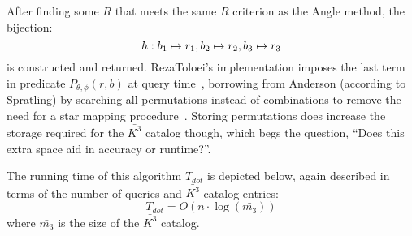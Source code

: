 After finding some $R$ that meets the same $R$ criterion as the Angle method, the bijection:
\begin{equation}
    h: b_1 \mapsto r_1, b_2 \mapsto r_2, b_3 \mapsto r_3
\end{equation}
is constructed and returned.
RezaToloei's implementation imposes the last term in predicate $P_{\theta, \phi}(r, b)$ at query
time~\cite{toloei:compositeIdentification}, borrowing from Anderson (according to Spratling) by searching all
permutations instead of combinations to remove the need for a star mapping
procedure~\cite{anderson:autonomousStarSensing}.
Storing permutations does increase the storage required for the $\bar{K^3}$ catalog though, which begs the question,
``Does this extra space aid in accuracy or runtime?''.

%

The running time of this algorithm $T_{dot}$ is depicted below, again described in terms of the number of queries
and $\bar{K^3}$ catalog entries:
\begin{equation}\label{eq:dotComplexity}
    T_{dot} = O\left( n \cdot \log(\bar{m_3}) \right)
\end{equation}
where $\bar{m_3}$ is the size of the $\bar{K^3}$ catalog.


